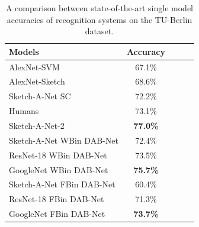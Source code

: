 \begin{table}[t]
\begin{center}
\begin{tabular}{|l|c|c|c|l|}
\hline
{\bf Models}  &  {\bf Accuracy}\\
\hline
AlexNet-SVM  & 67.1\%\\
AlexNet-Sketch  & 68.6\%\\
Sketch-A-Net SC  & 72.2\%\\
Humans & {73.1\%}\\
Sketch-A-Net-2\footnotemark \cite{yu2017sketch} & {\bf 77.0\%}\\
\hline
Sketch-A-Net WBin DAB-Net & 72.4\%\\
ResNet-18 WBin DAB-Net & 73.5\%\\
GoogleNet WBin DAB-Net & {\bf 75.7\%}\\
\hline
Sketch-A-Net FBin DAB-Net & 60.4\%\\
ResNet-18 FBin DAB-Net & 71.3\%\\
GoogleNet FBin DAB-Net & {\bf 73.7\%}\\
\hline
\end{tabular}
\end{center}
\caption{A comparison between state-of-the-art single model accuracies of recognition systems on the TU-Berlin dataset.}
\label{table:sketchcomp}
\end{table}
